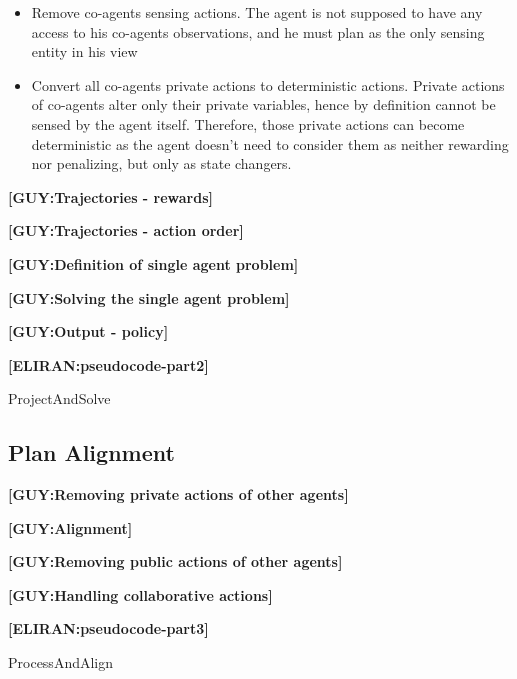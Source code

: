 \documentclass[letterpaper]{article} %
\newcommand{\eliran}[1]{\textbf{[\color{red}ELIRAN:#1]}}
\newcommand{\guy}[1]{\textbf{[\color{orange}GUY:#1]}}
\begin{document}
\begin{itemize}
\item{Remove co-agents sensing actions. The agent is not supposed to have any access to his co-agents observations, and he must plan as the only sensing entity in his view}
\item{Convert all co-agents private actions to deterministic actions. Private actions of co-agents alter only their private variables, hence by definition cannot be sensed by the agent itself. Therefore, those private actions can become deterministic as the agent doesn't need to consider them as neither rewarding nor penalizing, but only as state changers.}
\end{itemize}

\guy{Trajectories - rewards}

\guy{Trajectories - action order}

\guy{Definition of single agent problem}

\guy{Solving the single agent problem}

\guy{Output - policy}

\eliran{pseudocode-part2}
\begin{algorithm}
\caption{ProjectAndSolve}
\begin{algorithmic}[tbph]
\State {}
\end{algorithmic}
\end{algorithm}

\subsection{Plan Alignment}

\guy{Removing private actions of other agents}

\guy{Alignment}

\guy{Removing public actions of other agents}

\guy{Handling collaborative actions}

\eliran{pseudocode-part3}
\begin{algorithm}
\caption{ProcessAndAlign}
\begin{algorithmic}[tbph]
\State {}
\end{algorithmic}
\end{algorithm}
\end{document}
